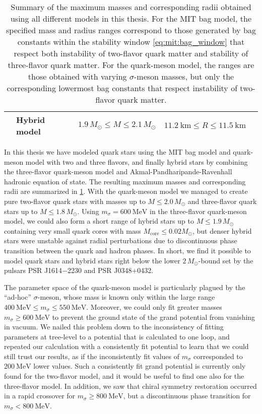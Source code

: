 \begin{table}
{\begin{tabular}{ l l c c c }
	\Cref{chap:hybrid} & Hybrid model & $1.9 \, M_\odot \leq M \leq 2.1 \, M_\odot$ & $\SI{11.2}{\kilo\meter} \leq R \leq \SI{11.5}{\kilo\meter}$ \\
	\bottomrule
\end{tabular}}
\caption{\label{tab:master_conclusion:results}%
Summary of the maximum masses and corresponding radii obtained using all different models in this thesis.
For the MIT bag model, the specified mass and radius ranges correspond to those generated by bag constants within the stability window \eqref{eq:mit:bag_window}
that respect both instability of two-flavor quark matter and stability of three-flavor quark matter.
For the quark-meson model, the ranges are those obtained with varying $\sigma$-meson masses, but only the corresponding lowermost bag constants that respect instability of two-flavor quark matter.
}
\end{table}

In this thesis we have modeled quark stars using the MIT bag model and quark-meson model with two and three flavors,
and finally hybrid stars by combining the three-flavor quark-meson model and Akmal-Pandharipande-Ravenhall hadronic equation of state.
The resulting maximum masses and corresponding radii are summarized in \cref{tab:master_conclusion:results}.
With the quark-meson model we managed to create pure two-flavor quark stars with masses up to $M \leq 2.0 \, M_\odot$ and three-flavor quark stars up to $M \leq 1.8 \, M_\odot$.
Using $m_\sigma = \SI{600}{\mega\electronvolt}$ in the three-flavor quark-meson model,
we could also form a short range of hybrid stars up to $M \leq 1.9 \, M_\odot$ containing very small quark cores with mass $M_\text{core} \leq 0.02 M_\odot$,
but denser hybrid stars were unstable against radial perturbations due to discontinuous phase transition between the quark and hadron phases.
In short, we find it possible to model quark stars and hybrid stars right below the lower $2 \, M_\odot$-bound set by the pulsars PSR J1614$-$2230 and PSR J0348$+$0432.

The parameter space of the quark-meson model is particularly plagued by the ``ad-hoc'' $\sigma$-meson,
whose mass is known only within the large range $\SI{400}{\mega\electronvolt} \leq m_\sigma \leq \SI{550}{\mega\electronvolt}$.
Moreover, we could only fit greater masses $m_\sigma \geq \SI{600}{\mega\electronvolt}$ to prevent the ground state of the grand potential from vanishing in vacuum.
We nailed this problem down to the inconsistency of fitting parameters at tree-level to a potential that is calculated to one loop,
and repeated our calculation with a consistently fit potential to learn that we could still trust our results,
as if the inconsistently fit values of $m_\sigma$ corresponded to $\SI{200}{\mega\electronvolt}$ lower values.
Such a consistently fit grand potential is currently only found for the two-flavor model, and it would be useful to find one also for the three-flavor model.
In addition, we saw that chiral symmetry restoration occurred in a rapid crossover for $m_\sigma \geq \SI{800}{\mega\electronvolt}$,
but a discontinuous phase transition for $m_\sigma < \SI{800}{\mega\electronvolt}$.

